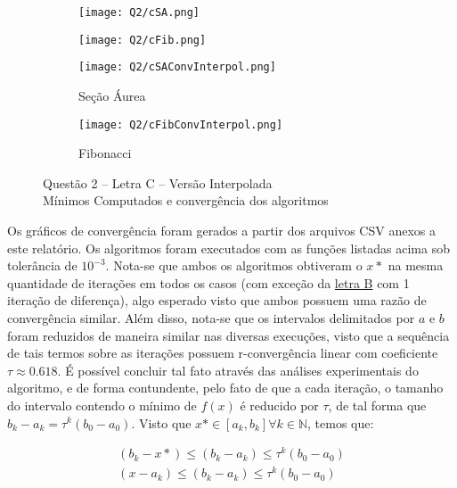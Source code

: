 \documentclass[fleqn, 11pt]{article}
\begin{document}
\begin{figure}[H]
\centering
\begin{subfigure}{.5\textwidth}
  \centering
  \texttt{[image: Q2/cSA.png]}
\end{subfigure}%
\begin{subfigure}{.5\textwidth}
  \centering
  \texttt{[image: Q2/cFib.png]}
\end{subfigure}

\centering
\begin{subfigure}{.5\textwidth}
  \centering
  \texttt{[image: Q2/cSAConvInterpol.png]}
  \caption{Seção Áurea}
\end{subfigure}%
\begin{subfigure}{.5\textwidth}
  \centering
  \texttt{[image: Q2/cFibConvInterpol.png]}
  \caption{Fibonacci}
\end{subfigure}
\label{Q2C}
\caption{Questão 2 -- Letra C -- Versão Interpolada \\ Mínimos Computados e convergência dos algoritmos}
\end{figure}

Os gráficos de convergência foram gerados a partir dos arquivos CSV anexos a este relatório. Os algoritmos foram executados com as funções listadas acima sob tolerância de $10^{-3}$. Nota-se que ambos os 
algoritmos obtiveram o $x*$ na mesma quantidade de iterações em todos os casos (com exceção da \hyperref[Q2B]{letra 
B} com 1 iteração de diferença), algo esperado visto que ambos possuem uma razão de convergência similar. Além disso, 
nota-se que os intervalos delimitados por $a$ e $b$ foram reduzidos de maneira similar nas diversas execuções, visto 
que a sequência de tais termos sobre as iterações possuem r-convergência linear com coeficiente $\tau \approx 0.618$. 
É possível concluir tal fato através das análises experimentais do algoritmo, e de forma contundente, pelo fato de 
que a cada iteração, o tamanho do intervalo contendo o mínimo de $f(x)$ é reducido por $\tau$, de tal forma que $b_k 
- a_k = \tau^k (b_0 - a_0)$. Visto que $x* \in [a_k,b_k] \forall k \in \mathbb{N}$, temos que:

\begin{equation}
\begin{split}
(b_k-x*) \leq (b_k-a_k) \leq \tau^k (b_0-a_0) \\
(x-a_k) \leq (b_k-a_k) \leq \tau^k (b_0-a_0)
\end{split}
\end{equation}
\end{document}
